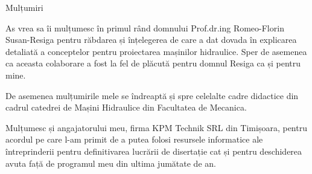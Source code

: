 \begin{center}
\makeatletter
{}
{ Mulțumiri}
\makeatother
\end{center}
\vspace{10mm}

As vrea sa îi mulțumesc în primul rând domnului Prof.dr.ing Romeo-Florin Susan-Resiga pentru răbdarea și înțelegerea de care a dat dovada în explicarea detaliată a conceptelor pentru proiectarea mașinilor hidraulice. Sper de asemenea ca aceasta colaborare a fost la fel de plăcută pentru domnul Resiga ca și pentru mine.

De asemenea mulțumirile mele se îndreaptă și spre celelalte cadre didactice din cadrul catedrei de Mașini Hidraulice din Facultatea de Mecanica.

Mulțumesc și angajatorului meu, firma KPM Technik SRL din Timișoara, pentru acordul pe care l-am primit de a putea folosi resursele informatice ale întreprinderii pentru definitivarea lucrării de disertație cat și pentru deschiderea avuta față de programul meu din ultima jumătate de an.

\cleardoublepage{}